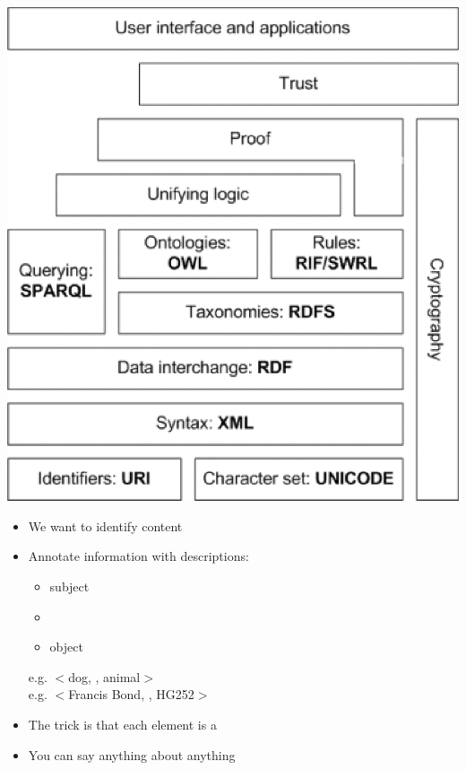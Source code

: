 \documentclass[a4paper,landscape,headrule,footrule,xetex]{foils}
\begin{document}
\includegraphics[height=\textheight]{../pics/semantic-web-layers.eps}


\begin{itemize}
\item We want to identify content
\item Annotate information with descriptions:
  \\ 
  \begin{itemize}
  \item subject 
  \item {}
  \item object
  \end{itemize}
 e.g. $<$dog, , animal$>$ 
\\ e.g. $<$Francis Bond, , HG252$>$
\item The trick is that each element is a 
\item You can say anything about anything
\end{itemize}

\end{document}
